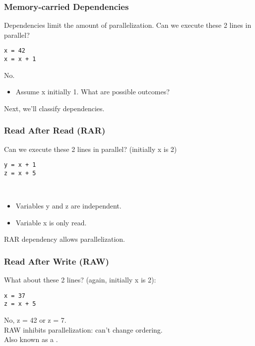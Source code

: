 \begin{frame}[fragile]
\frametitle{Memory-carried Dependencies}

Dependencies limit the amount of parallelization.
\vfill
Can we execute these 2 lines in parallel?
\begin{lstlisting}
x = 42
x = x + 1  
\end{lstlisting}
\pause
\alert{No.}\\[1em]
\begin{itemize}
\item Assume x initially 1. What are possible outcomes?
\pause \newline {}\\[1em]

\end{itemize}

Next, we'll classify dependencies.



\end{frame}

\begin{frame}[fragile]
\frametitle{Read After Read (RAR)}

Can we execute these 2 lines in parallel? (initially x is 2)
\begin{lstlisting}
y = x + 1
z = x + 5
\end{lstlisting}
\pause
{}\\[1em]
\begin{itemize}
\item Variables y and z are independent.
\item Variable x is only read.
\end{itemize}

RAR dependency allows parallelization.



\end{frame}

\begin{frame}[fragile]
\frametitle{Read After Write (RAW)}


What about these 2 lines? (again, initially x is 2):
\begin{lstlisting}
x = 37
z = x + 5
\end{lstlisting}
\pause
\alert{No, z = 42 or z = 7.}\\[1em]

RAW inhibits parallelization: can't change ordering.\\
Also known as a .

\end{frame}

